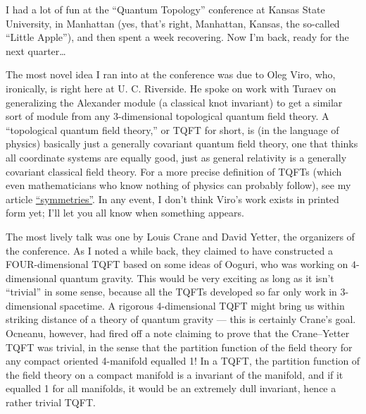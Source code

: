 \documentclass{article}
\begin{document}
I had a lot of fun at the ``Quantum Topology'' conference at Kansas
State University, in Manhattan (yes, that's right, Manhattan, Kansas,
the so-called ``Little Apple''), and then spent a week recovering. Now
I'm back, ready for the next quarter\ldots{}

The most novel idea I ran into at the conference was due to Oleg Viro,
who, ironically, is right here at U. C. Riverside. He spoke on work with
Turaev on generalizing the Alexander module (a classical knot invariant)
to get a similar sort of module from any \(3\)-dimensional topological
quantum field theory. A ``topological quantum field theory,'' or TQFT
for short, is (in the language of physics) basically just a generally
covariant quantum field theory, one that thinks all coordinate systems
are equally good, just as general relativity is a generally covariant
classical field theory. For a more precise definition of TQFTs (which
even mathematicians who know nothing of physics can probably follow),
see my article
\href{http://math.ucr.edu/home/baez/symmetries.html}{``symmetries''}. In
any event, I don't think Viro's work exists in printed form yet; I'll
let you all know when something appears.

The most lively talk was one by Louis Crane and David Yetter, the
organizers of the conference. As I noted a while back, they claimed to
have constructed a FOUR-dimensional TQFT based on some ideas of Ooguri,
who was working on \(4\)-dimensional quantum gravity. This would be very
exciting as long as it isn't ``trivial'' in some sense, because all the
TQFTs developed so far only work in \(3\)-dimensional spacetime. A
rigorous 4-dimensional TQFT might bring us within striking distance of a
theory of quantum gravity --- this is certainly Crane's goal. Ocneanu,
however, had fired off a note claiming to prove that the Crane--Yetter
TQFT was trivial, in the sense that the partition function of the field
theory for any compact oriented 4-manifold equalled 1! In a TQFT, the
partition function of the field theory on a compact manifold is a
invariant of the manifold, and if it equalled 1 for all manifolds, it
would be an extremely dull invariant, hence a rather trivial TQFT.
\end{document}
